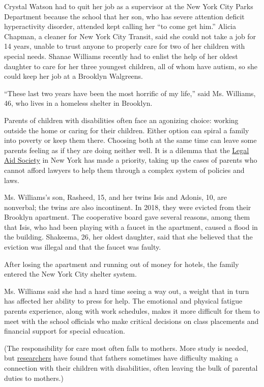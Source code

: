 Crystal Watson had to quit her job as a supervisor at the New York City
Parks Department because the school that her son, who has severe
attention deficit hyperactivity disorder, attended kept calling her ``to
come get him.'' Alicia Chapman, a cleaner for New York City Transit,
said she could not take a job for 14 years, unable to trust anyone to
properly care for two of her children with special needs. Shanae
Williams recently had to enlist the help of her oldest daughter to care
for her three youngest children, all of whom have autism, so she could
keep her job at a Brooklyn Walgreens.

``These last two years have been the most horrific of my life,'' said
Ms. Williams, 46, who lives in a homeless shelter in Brooklyn.

Parents of children with disabilities often face an agonizing choice:
working outside the home or caring for their children. Either option can
spiral a family into poverty or keep them there. Choosing both at the
same time can leave some parents feeling as if they are doing neither
well. It is a dilemma that the \href{https://www.legalaidnyc.org/}{Legal
Aid Society} in New York has made a priority, taking up the cases of
parents who cannot afford lawyers to help them through a complex system
of policies and laws.

Ms. Williams's son, Rasheed, 15, and her twins Isis and Adonis, 10, are
nonverbal; the twins are also incontinent. In 2018, they were evicted
from their Brooklyn apartment. The cooperative board gave several
reasons, among them that Isis, who had been playing with a faucet in the
apartment, caused a flood in the building. Shakeema, 26, her oldest
daughter, said that she believed that the eviction was illegal and that
the faucet was faulty.

After losing the apartment and running out of money for hotels, the
family entered the New York City shelter system.

Ms. Williams said she had a hard time seeing a way out, a weight that in
turn has affected her ability to press for help. The emotional and
physical fatigue parents experience, along with work schedules, makes it
more difficult for them to meet with the school officials who make
critical decisions on class placements and financial support for special
education.

(The responsibility for care most often falls to mothers. More study is
needed, but
\href{https://digitalcommons.usu.edu/cgi/viewcontent.cgi?article=3071\&context=etd}{researchers}
have found that fathers sometimes have difficulty making a connection
with their children with disabilities, often leaving the bulk of
parental duties to mothers.)

